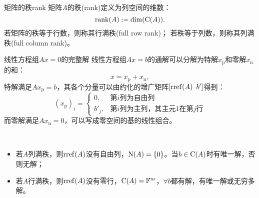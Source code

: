 \begin{definition}{矩阵的秩}{rank}
	矩阵$A$的秩(rank)定义为列空间的维数：%
	\[
		\operatorname{rank}(A):=\dim(\operatorname{C}(A)).
	\]
	若矩阵的秩等于行数，则称其行满秩(full row rank)；
	若秩等于列数，则称其列满秩(full column rank)。
\end{definition}
\begin{theorem}
	{线性方程组$Ax=0$的完整解}{}
	线性方程组$Ax=b$的通解可以分解为特解$x_{\mathrm p}$和零解$x_{\mathrm n}$的和：
	\[
		x=x_{\mathrm p}+x_{\mathrm n},
	\]
	特解满足$Ax_{\mathrm p}=b$，其各个分量可以由约化的增广矩阵$[\operatorname{rref}(A)\enspace b']$得到：
	\[
		(x_{\mathrm p})_i=\begin{cases}
			0,&\text{第$i$列为自由列}\\
			b'_j,&\text{第$i$列为主列，其主元1在第$j$行}
		\end{cases}
	\]
	而零解满足$Ax_{\mathrm n}=0$，可以写成零空间的基的线性组合。
\end{theorem}
\begin{corollary}
	~
	\begin{itemize}
		\item 若$A$列满秩，则$\operatorname{rref}(A)$没有自由列，$\operatorname{N}(A)=\{0\}$。当$b\in\operatorname{C}(A)$时有唯一解，否则无解；
		\item 若$A$行满秩，则$\operatorname{rref}(A)$没有零行，$\operatorname{C}(A)=\mathbb F^m$，$\forall b$都有解，有唯一解或无穷多解。
	\end{itemize}
\end{corollary}
